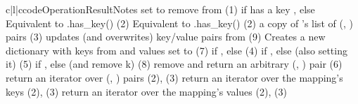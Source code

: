 \begin{tableiii}{c|l|c}{code}{Operation}{Result}{Notes}
          {set  to }
          {}
          {remove  from }
          {(1)}
          { if  has a key , else }
          {}
          {Equivalent to .has_key()}
          {(2)}
          {Equivalent to  .has_key()}
          {(2)}
          {a copy of 's list of (, ) pairs}
          {(3)}
          {updates (and overwrites) key/value pairs from }
          {(9)}
          {Creates a new dictionary with keys from  and values set to }
          {(7)}			   
          { if ,
           else }
          {(4)}
          { if ,
           else  (also setting it)}
          {(5)}
          { if ,
           else  (and remove k)}
          {(8)}
          {remove and return an arbitrary (, ) pair}
          {(6)}
          {return an iterator over (, ) pairs}
          {(2), (3)}
          {return an iterator over the mapping's keys}
          {(2), (3)}
          {return an iterator over the mapping's values}
          {(2), (3)}
\end{tableiii}

